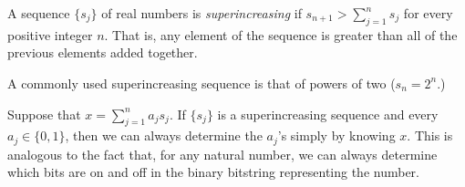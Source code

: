 \documentclass{article}
\begin{document}
A sequence $\{s_j\}$ of real numbers is \emph{superincreasing} if $\displaystyle s_{n+1} > \sum_{j=1}^n s_j$ for every positive integer $n$.  That is, any element of the sequence is greater than all of the previous elements added together.

A commonly used superincreasing sequence is that of powers of two ($s_n = 2^n$.)

Suppose that $\displaystyle x=\sum_{j=1}^n a_j s_j$.  If $\{s_j\}$ is a superincreasing sequence and every $a_j \in \{0,1\}$, then we can always determine the $a_j$'s simply by knowing $x$.  This is analogous to the fact that, for any natural number, we can always determine which bits are on and off in the binary bitstring representing the number.
\end{document}
